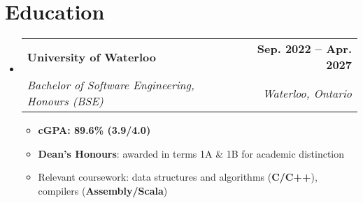 \documentclass[letterpaper,11pt]{article}
\makeatletter
\newcommand{\resumeItem}[1]{
  \item\small{
    {#1 \vspace{-2pt}}
  }
}
\newcommand{\resumeSubheading}[4]{
  \vspace{-2pt}\item
    \begin{tabular*}{1.0\textwidth}[t]{l@{\extracolsep{\fill}}r}
      \textbf{#1} & \textbf{\small #2} \\
      \textit{\small#3} & \textit{\small #4} \\
    \end{tabular*}\vspace{-7pt}
}
\newcommand{\resumeSubHeadingListStart}{\begin{itemize}[leftmargin=0.0in, label={}]}
\newcommand{\resumeSubHeadingListEnd}{\end{itemize}}
\newcommand{\resumeItemListStart}{\begin{itemize}}
\newcommand{\resumeItemListEnd}{\end{itemize}\vspace{-5pt}}
\makeatother
\begin{document}
\section{Education}
\resumeSubHeadingListStart
    \resumeSubheading
    {University of Waterloo}{Sep. 2022 -- Apr. 2027}
    {Bachelor of Software Engineering, Honours (BSE)}{Waterloo, Ontario}
    \resumeItemListStart
        \resumeItem{\textbf{cGPA: 89.6\% (3.9/4.0)}}
        \resumeItem{\textbf{Dean's Honours}: awarded in terms 1A \& 1B for academic distinction}
        \resumeItem{Relevant coursework: data structures and algorithms (\textbf{C/C++}), compilers (\textbf{Assembly/Scala})}
    \resumeItemListEnd
\resumeSubHeadingListEnd
\end{document}
